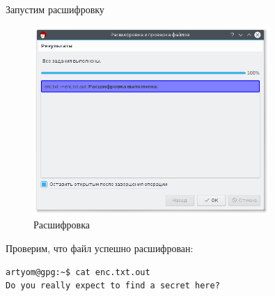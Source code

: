 Запустим расшифровку

\begin{figure}[H]
	\centering
	\includegraphics[width=0.8\textwidth]{figures/screen23.png}
	\caption{Расшифровка}
\end{figure}

Проверим, что файл успешно расшифрован:

\begin{verbatim}
artyom@gpg:~$ cat enc.txt.out 
Do you really expect to find a secret here?
\end{verbatim}